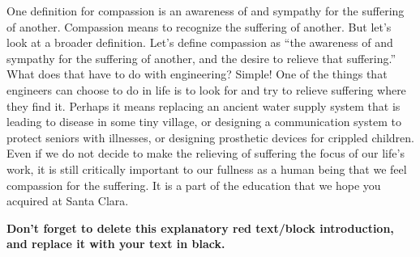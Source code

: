 \begin{tcolorbox}[      %
    boxrule=0pt,        %
    colback=white,      %
    coltext=red         %
]                       %
    One definition for compassion is an awareness of and sympathy for the suffering of another. Compassion means to recognize the suffering of another. But let’s look at a broader definition. Let’s define compassion as “the awareness of and sympathy for the suffering of another, and the desire to relieve that suffering.” What does that have to do with engineering? Simple! One of the things that engineers can choose to do in life is to look for and try to relieve suffering where they find it. Perhaps it means replacing an ancient water supply system that is leading to disease in some tiny village, or designing a communication system to protect seniors with illnesses, or designing prosthetic devices for crippled children. Even if we do not decide to make the relieving of suffering the focus of our life’s work, it is still critically important to our fullness as a human being that we feel compassion for the suffering. It is a part of the education that we hope you acquired at Santa Clara.
    
    \vspace{15pt}       %
    \begin{center}      %
    \textbf{Don't forget to delete this explanatory red text/block introduction, and replace it with your text in black.}
    \end{center}        %
\end{tcolorbox}         %

